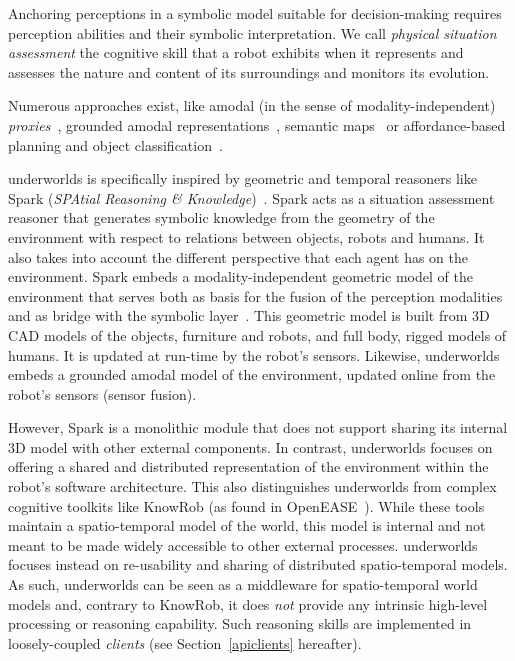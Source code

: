 \documentclass[letterpaper, 10pt, conference]{ieeeconf}
\newcommand{\uwds}{{\sc underworlds}\xspace}
\begin{document}
Anchoring perceptions in a symbolic model suitable for decision-making requires
perception abilities and their symbolic interpretation. We call \emph{physical
situation assessment} the cognitive skill that a robot exhibits when it
represents and assesses the nature and content of its surroundings and monitors
its evolution.

Numerous approaches exist, like amodal (in the sense of modality-independent)
\emph{proxies}~\cite{Jacobsson2008}, grounded amodal
representations~\cite{Mavridis2006}, semantic
maps~\cite{Nuechter2008, Galindo2008,Blodow2011} or affordance-based planning
and object classification~\cite{Lorken2008, Varadarajan2011}.


\uwds is specifically inspired by geometric and temporal reasoners like {\sc Spark}
(\emph{SPAtial Reasoning \& Knowledge})~\cite{sisbot2011situation}.  {\sc Spark}
acts as a situation assessment reasoner that generates symbolic knowledge from
the geometry of the environment with respect to relations between objects,
robots and humans. It also takes into account the different perspective that
each agent has on the environment. {\sc Spark} embeds a modality-independent
geometric model of the environment that serves both as basis for the fusion of
the perception modalities and as bridge with the symbolic
layer~\cite{lemaignan2016artificial}. This geometric model is built from 3D CAD
models of the objects, furniture and robots, and full body, rigged models of
humans. It is updated at run-time by the robot's sensors.  Likewise, \uwds
embeds a grounded amodal model of the environment, updated online from the
robot's sensors (sensor fusion).

However, {\sc Spark} is a monolithic module that does not support sharing its
internal 3D model with other external components. In contrast, \uwds focuses on
offering a shared and distributed representation of the environment within the
robot's software architecture. This also distinguishes \uwds from complex
cognitive toolkits like KnowRob (as found in OpenEASE~\cite{beetz2015open}).
While these tools maintain a spatio-temporal model of the world, this model is
internal and not meant to be made widely accessible to other external processes.
\uwds focuses instead on re-usability and sharing of distributed spatio-temporal
models.  As such, \uwds can be seen as a middleware for spatio-temporal world
models and, contrary to KnowRob, it does \emph{not} provide any intrinsic high-level
processing or reasoning capability. Such reasoning skills are implemented in
loosely-coupled \emph{clients} (see Section~\ref{apiclients} hereafter).
\end{document}
